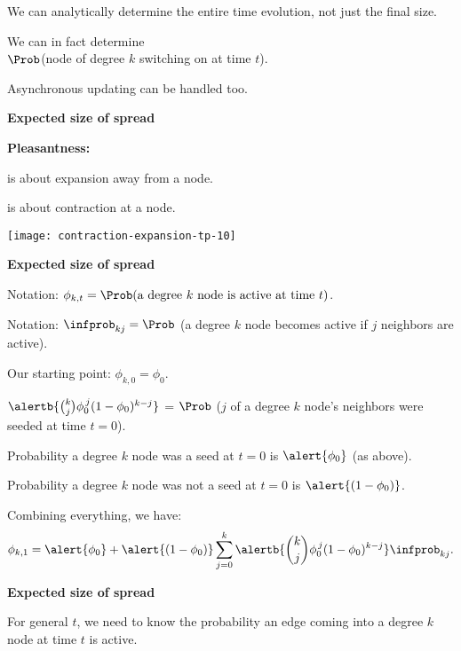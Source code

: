 {{{{      We can analytically determine the entire time evolution,
      not just the final size.
    
      We can in fact determine \\
      $\Prob$(node of degree $k$ switching on at time $t$).
    
      Asynchronous updating can be handled too.
    
  



  \textbf{Expected size of spread}

  \textbf{Pleasantness:}
    
     
       is about \alert{expansion} away from
      a node.
     
       is about \alert{contraction} at
      a node.
    
    \texttt{[image: contraction-expansion-tp-10]}
  


  \small

  \textbf{Expected size of spread}

  
  
  
    \alert{Notation:}
    $ \phi_{k,t} = 
    \Prob(\mbox{a degree $k$ node is active at time $t$}) $.
  
    \alert{Notation:}
    $\infprob_{k j} = \Prob$ (a degree $k$ node becomes active
    if $j$ neighbors are active).
   
    Our starting point: $ \phi_{k,0} = \phi_0$.
  
    $ 
    \alertb{\binom{k}{j}
      \phi_0^{\, j}
      (1-\phi_0)^{k-j} }
    $ 
    =
    $\Prob$ ($j$ of a degree $k$ node's neighbors were seeded at time $t=0$).
   
    Probability a degree $k$ node was a seed at $t=0$ is $\alert{\phi_0}$ (as above).
   
    Probability a degree $k$ node was not a seed at $t=0$ is $\alert{(1-\phi_0)}$.
   
    Combining everything, we have:
    $$ 
    \phi_{k,1}
    = 
    \alert{\phi_{0}}
    + 
    \alert{(1-\phi_{0})}
    \sum_{j=0}^{k}
    \alertb{\binom{k}{j}
    \phi_0^{\, j}
    (1-\phi_0)^{k-j} }
  \infprob_{k j}.
    $$
  
  


  \textbf{Expected size of spread}

  
  
  
    For general $t$, we need to know
    the probability an edge coming into a degree $k$ node
    at time $t$ is active.
  
}}}}
